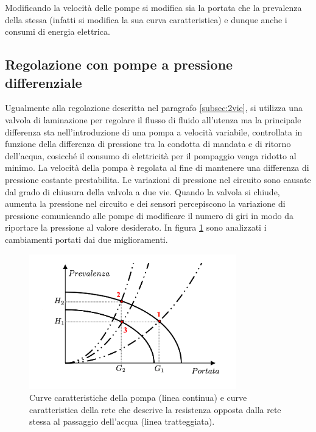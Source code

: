 \documentclass[laurea,oneside,11pt]{USiena_tesiLM}
\begin{document}
Modificando la velocità delle pompe si modifica sia la portata che la prevalenza della stessa (infatti si modifica la sua curva caratteristica) e dunque anche i consumi di energia elettrica. 

\subsection{Regolazione con pompe a pressione differenziale}
Ugualmente alla regolazione descritta nel paragrafo \ref{subsec:2vie}, si utilizza una valvola di laminazione per regolare il flusso di fluido all'utenza ma la principale differenza sta nell'introduzione di una pompa a velocità variabile, controllata in funzione della differenza di pressione tra la condotta di mandata e di ritorno dell'acqua, cosicché il consumo di elettricità per il pompaggio venga ridotto al minimo.
 La velocità della pompa è regolata al fine di mantenere una differenza di pressione costante prestabilita. Le variazioni di pressione nel circuito sono causate dal grado di chiusura della valvola a due vie. Quando la valvola si chiude, aumenta la pressione nel circuito e dei sensori percepiscono la variazione di pressione comunicando alle pompe di modificare il numero di giri in modo da riportare la pressione al valore desiderato. In figura \ref{fig:giri_variabili} sono analizzati i cambiamenti portati dai due miglioramenti.

\begin{figure}[!ht]
\centering
\includegraphics[width=0.8\textwidth]{figure/giri_variabili}
\caption{Curve caratteristiche della pompa (linea continua) e curve caratteristica della rete che descrive la resistenza opposta dalla rete stessa al passaggio dell'acqua (linea tratteggiata).}
\label{fig:giri_variabili}
\end{figure}
\end{document}

